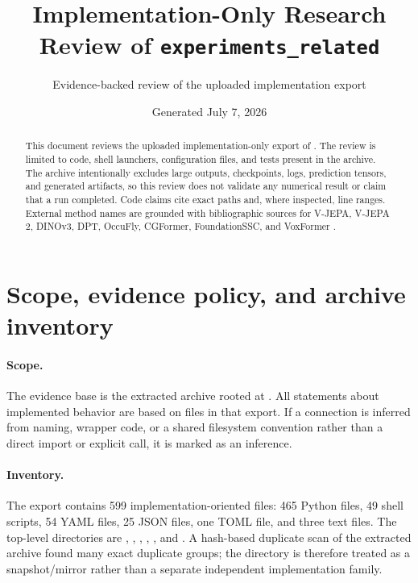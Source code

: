 \documentclass[11pt]{article}
\title{Implementation-Only Research Review of \texttt{experiments\_related}}
\author{Evidence-backed review of the uploaded implementation export}
\date{Generated July 7, 2026}
\begin{document}
\maketitle

\begin{abstract}
This document reviews the uploaded implementation-only export of .  The review is limited to code, shell launchers, configuration files, and tests present in the archive.  The archive intentionally excludes large outputs, checkpoints, logs, prediction tensors, and generated artifacts, so this review does not validate any numerical result or claim that a run completed.  Code claims cite exact paths and, where inspected, line ranges.  External method names are grounded with bibliographic sources for V-JEPA, V-JEPA 2, DINOv3, DPT, OccuFly, CGFormer, FoundationSSC, and VoxFormer \cite{vjepa2024,vjepa22025,dinov32025,dpt2021,occufly2026,cgformer2024,foundationssc2025,voxformer2023}.
\end{abstract}

\section{Scope, evidence policy, and archive inventory}
\label{sec:scope}

\paragraph{Scope.}  The evidence base is the extracted archive rooted at .  All statements about implemented behavior are based on files in that export.  If a connection is inferred from naming, wrapper code, or a shared filesystem convention rather than a direct import or explicit call, it is marked as an inference.

\paragraph{Inventory.}  The export contains 599 implementation-oriented files: 465 Python files, 49 shell scripts, 54 YAML files, 25 JSON files, one TOML file, and three text files.  The top-level directories are , , , , , and .  A hash-based duplicate scan of the extracted archive found many exact duplicate groups; the  directory is therefore treated as a snapshot/mirror rather than a separate independent implementation family.
\end{document}
